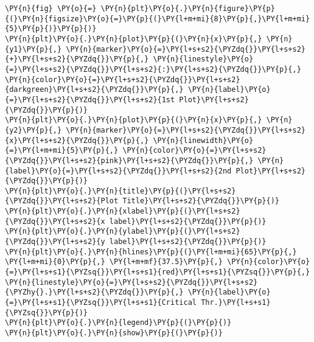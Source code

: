     \begin{tcolorbox}[breakable, size=fbox, boxrule=1pt, pad at break*=1mm,colback=cellbackground, colframe=cellborder]
\begin{Verbatim}[commandchars=\\\{\}]
\PY{n}{fig} \PY{o}{=} \PY{n}{plt}\PY{o}{.}\PY{n}{figure}\PY{p}{(}\PY{n}{figsize}\PY{o}{=}\PY{p}{(}\PY{l+m+mi}{8}\PY{p}{,}\PY{l+m+mi}{5}\PY{p}{)}\PY{p}{)}
\PY{n}{plt}\PY{o}{.}\PY{n}{plot}\PY{p}{(}\PY{n}{x}\PY{p}{,} \PY{n}{y1}\PY{p}{,} \PY{n}{marker}\PY{o}{=}\PY{l+s+s2}{\PYZdq{}}\PY{l+s+s2}{+}\PY{l+s+s2}{\PYZdq{}}\PY{p}{,} \PY{n}{linestyle}\PY{o}{=}\PY{l+s+s2}{\PYZdq{}}\PY{l+s+s2}{:}\PY{l+s+s2}{\PYZdq{}}\PY{p}{,} \PY{n}{color}\PY{o}{=}\PY{l+s+s2}{\PYZdq{}}\PY{l+s+s2}{darkgreen}\PY{l+s+s2}{\PYZdq{}}\PY{p}{,} \PY{n}{label}\PY{o}{=}\PY{l+s+s2}{\PYZdq{}}\PY{l+s+s2}{1st Plot}\PY{l+s+s2}{\PYZdq{}}\PY{p}{)}
\PY{n}{plt}\PY{o}{.}\PY{n}{plot}\PY{p}{(}\PY{n}{x}\PY{p}{,} \PY{n}{y2}\PY{p}{,} \PY{n}{marker}\PY{o}{=}\PY{l+s+s2}{\PYZdq{}}\PY{l+s+s2}{x}\PY{l+s+s2}{\PYZdq{}}\PY{p}{,} \PY{n}{linewidth}\PY{o}{=}\PY{l+m+mi}{5}\PY{p}{,} \PY{n}{color}\PY{o}{=}\PY{l+s+s2}{\PYZdq{}}\PY{l+s+s2}{pink}\PY{l+s+s2}{\PYZdq{}}\PY{p}{,} \PY{n}{label}\PY{o}{=}\PY{l+s+s2}{\PYZdq{}}\PY{l+s+s2}{2nd Plot}\PY{l+s+s2}{\PYZdq{}}\PY{p}{)}
\PY{n}{plt}\PY{o}{.}\PY{n}{title}\PY{p}{(}\PY{l+s+s2}{\PYZdq{}}\PY{l+s+s2}{Plot Title}\PY{l+s+s2}{\PYZdq{}}\PY{p}{)}
\PY{n}{plt}\PY{o}{.}\PY{n}{xlabel}\PY{p}{(}\PY{l+s+s2}{\PYZdq{}}\PY{l+s+s2}{x label}\PY{l+s+s2}{\PYZdq{}}\PY{p}{)}
\PY{n}{plt}\PY{o}{.}\PY{n}{ylabel}\PY{p}{(}\PY{l+s+s2}{\PYZdq{}}\PY{l+s+s2}{y label}\PY{l+s+s2}{\PYZdq{}}\PY{p}{)}
\PY{n}{plt}\PY{o}{.}\PY{n}{hlines}\PY{p}{(}\PY{l+m+mi}{65}\PY{p}{,} \PY{l+m+mi}{0}\PY{p}{,} \PY{l+m+mf}{37.5}\PY{p}{,} \PY{n}{color}\PY{o}{=}\PY{l+s+s1}{\PYZsq{}}\PY{l+s+s1}{red}\PY{l+s+s1}{\PYZsq{}}\PY{p}{,} \PY{n}{linestyle}\PY{o}{=}\PY{l+s+s2}{\PYZdq{}}\PY{l+s+s2}{\PYZhy{}.}\PY{l+s+s2}{\PYZdq{}}\PY{p}{,} \PY{n}{label}\PY{o}{=}\PY{l+s+s1}{\PYZsq{}}\PY{l+s+s1}{Critical Thr.}\PY{l+s+s1}{\PYZsq{}}\PY{p}{)}
\PY{n}{plt}\PY{o}{.}\PY{n}{legend}\PY{p}{(}\PY{p}{)}
\PY{n}{plt}\PY{o}{.}\PY{n}{show}\PY{p}{(}\PY{p}{)}
\end{Verbatim}
\end{tcolorbox}

    \begin{center}
    \end{center}
    { \hspace*{\fill} \\}
    
